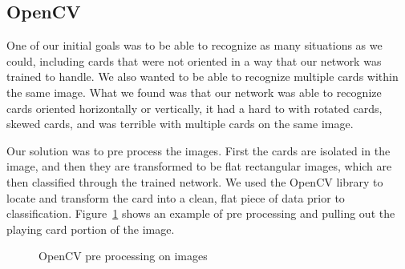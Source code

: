 \documentclass[letterpaper]{article}
\begin{document}
\subsection{OpenCV}
One of our initial goals was to be able to recognize as many situations as we could, including cards that were not oriented in a way that our network was trained to handle.  We also wanted to be able to recognize multiple cards within the same image.  What we found was that our network was able to recognize cards oriented horizontally or vertically, it had a hard to with rotated cards, skewed cards, and was terrible with multiple cards on the same image.

Our solution was to pre process the images.  First the cards are isolated in the image, and then they are transformed to be flat rectangular images, which are then classified through the trained network.  We used the OpenCV library to locate and transform the card into a clean, flat piece of data prior to classification.  Figure~\ref{fig:opencv_1} shows an example of pre processing and pulling out the playing card portion of the image.

\begin{figure}[!tbp]
  \centering

  \caption{\label{fig:opencv_1} OpenCV pre processing on images}
\end{figure}
\end{document}
